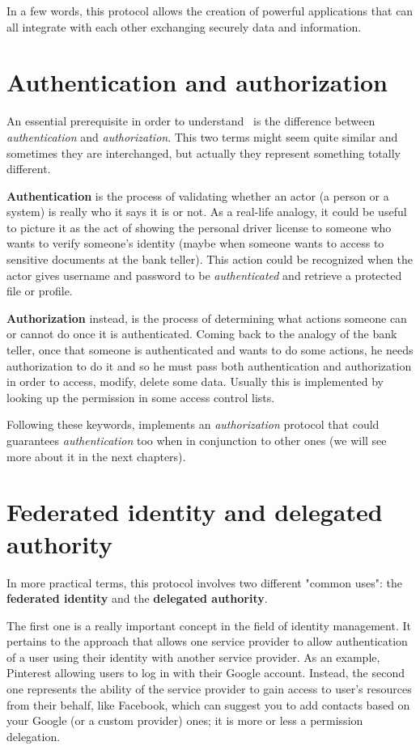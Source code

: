 In a few words, this protocol allows the creation of powerful applications that can all integrate with each other exchanging securely data and information.

\vspace{0.5cm}

\section{Authentication and authorization}
An essential prerequisite in order to understand \oauth\ is the difference between \textit{authentication} and \textit{authorization}. This two terms might seem quite similar and sometimes they are interchanged, but actually they represent something totally different.

\textbf{Authentication} is the process of validating whether an actor (a person or a system) is really who it says it is or not.
As a real-life analogy, it could be useful to picture it as the act of showing the personal driver license to someone who wants to verify someone's identity (maybe when someone wants to access to sensitive documents at the bank teller). 
This action could be recognized when the actor gives username and password to be \textit{authenticated} and retrieve a protected file or profile.

\textbf{Authorization} instead, is the process of determining what actions someone can or cannot do once it is authenticated.
Coming back to the analogy of the bank teller, once that someone is authenticated and wants to do some actions, he needs authorization to do it and so he must pass both authentication and authorization in order to access, modify, delete some data. Usually this is implemented by looking up the permission in some access control lists.

Following these keywords, \textit{\oauth} implements an \textit{authorization} protocol that could guarantees \textit{authentication} too when in conjunction to other ones (we will see more about it in the next chapters).

\section{Federated identity and delegated authority}
In more practical terms, this protocol involves two different "common uses": the \textbf{federated identity} and the \textbf{delegated authority}.

The first one is a really important concept in the field of identity management. It pertains to the approach that allows one service provider to allow authentication of a user using their identity with another service provider. As an example, Pinterest allowing users to log in with their Google account.
Instead, the second one represents the ability of the service provider to gain access to user's resources from their behalf, like Facebook, which can suggest you to add contacts based on your Google (or a custom provider) ones; it is more or less a permission delegation.

